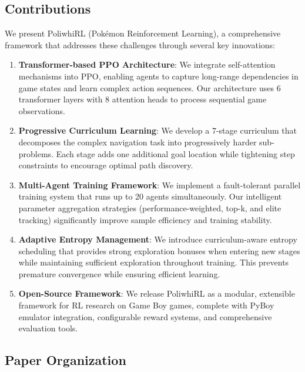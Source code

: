 \documentclass[12pt,a4paper]{article}
\begin{document}
\subsection{Contributions}

We present PoliwhiRL (Pokémon Reinforcement Learning), a comprehensive framework that addresses these challenges through several key innovations:

\begin{enumerate}
    \item \textbf{Transformer-based PPO Architecture}: We integrate self-attention mechanisms into PPO, enabling agents to capture long-range dependencies in game states and learn complex action sequences. Our architecture uses 6 transformer layers with 8 attention heads to process sequential game observations.
    
    \item \textbf{Progressive Curriculum Learning}: We develop a 7-stage curriculum that decomposes the complex navigation task into progressively harder sub-problems. Each stage adds one additional goal location while tightening step constraints to encourage optimal path discovery.
    
    \item \textbf{Multi-Agent Training Framework}: We implement a fault-tolerant parallel training system that runs up to 20 agents simultaneously. Our intelligent parameter aggregation strategies (performance-weighted, top-k, and elite tracking) significantly improve sample efficiency and training stability.
    
    \item \textbf{Adaptive Entropy Management}: We introduce curriculum-aware entropy scheduling that provides strong exploration bonuses when entering new stages while maintaining sufficient exploration throughout training. This prevents premature convergence while ensuring efficient learning.
    
    \item \textbf{Open-Source Framework}: We release PoliwhiRL as a modular, extensible framework for RL research on Game Boy games, complete with PyBoy emulator integration, configurable reward systems, and comprehensive evaluation tools.
\end{enumerate}

\subsection{Paper Organization}
\end{document}
